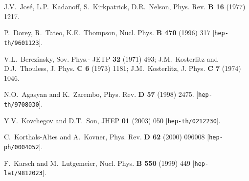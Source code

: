 \documentclass[a4paper,12pt]{article}
\begin{document}
\begin{thebibliography}{100}
 J.V.~Jos\'{e}, L.P.~Kadanoff, S.~Kirkpatrick, D.R.~Nelson, Phys. Rev. {\bf B 16} (1977) 1217.

P.~Dorey, R.~Tateo, K.E.~Thompson,
Nucl. Phys. {\bf B 470} (1996) 317
[{\tt hep-th/9601123}].

V.L.~Berezinsky, Sov. Phys.- JETP {\bf 32} (1971) 493; J.M.~Kosterlitz and D.J.~Thouless,
J. Phys. {\bf C 6} (1973) 1181; J.M.~Kosterlitz, J. Phys. {\bf C 7} (1974) 1046.

N.O.~Agasyan and K.~Zarembo, Phys. Rev. {\bf D 57} (1998) 2475.
[{\tt hep-th/9708030}].

 Y.V.~Kovchegov and D.T.~Son, JHEP {\bf 01} (2003) 050 [{\tt hep-th/0212230}].

 C.~Korthals-Altes and A.~Kovner,  Phys. Rev. {\bf D 62} (2000) 096008
[{\tt hep-ph/0004052}].

 F.~Karsch and  M.~Lutgemeier, Nucl. Phys. {\bf B 550} (1999) 449
[{\tt hep-lat/9812023}].







\end{thebibliography}
\end{document}
